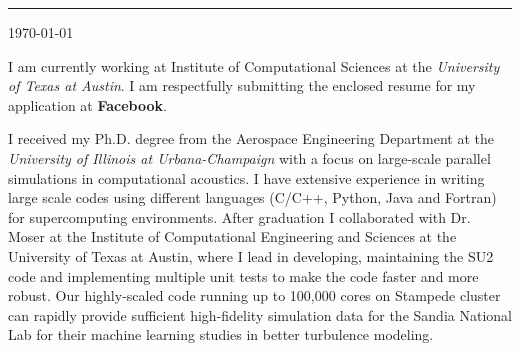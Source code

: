 \documentclass[11pt]{article}
\newcommand{\company}{\textbf{Facebook}}
\newcommand{\position}{\textit{software engineer }}
\begin{document}
\thispagestyle{empty}
%
%
\begin{minipage}[t]{0.45\textwidth}
\vspace{-0.5truein}
\end{minipage} 



%
%
\vspace{0.2truein}
\rule[0.8em]{\textwidth}{1.0pt} 

\noindent
\begin{minipage}[b]{0.7\textwidth}
\vspace{-0.35truein}
\noindent
\small
\begin{tabbing}
\end{tabbing}
\vspace{0pt}
\end{minipage} \hfill
\begin{minipage}[b]{0.7\textwidth}
\vspace{0pt}
\noindent
\begin{tabbing}
\today 
\end{tabbing}
\vspace{0pt}
\end{minipage} 
%
%




I am currently working at Institute of Computational Sciences at the \emph{University of Texas at Austin}.   I am respectfully submitting the enclosed resume for my application at \company. %

I received my Ph.D. degree from the Aerospace Engineering Department at the \emph{University of Illinois at Urbana-Champaign} with a focus on large-scale parallel simulations in computational acoustics.   I have extensive experience in writing large scale codes using different languages (C/C++, Python, Java and Fortran) for supercomputing environments.  After graduation I collaborated with Dr. Moser at the Institute of Computational Engineering and Sciences at the University of Texas at Austin, where I lead in developing, maintaining the SU2 code and implementing multiple unit tests to make the code faster and more robust.   Our highly-scaled code running up to 100,000 cores on Stampede cluster can rapidly provide sufficient high-fidelity simulation data for the Sandia National Lab for their machine learning studies in better turbulence modeling.  
\end{document}

